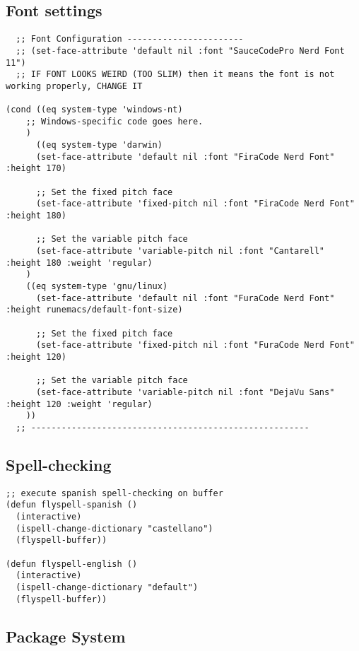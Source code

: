 \documentclass[11pt]{article}
\begin{document}
\subsection{Font settings}
\label{sec:org782d61d}
\begin{verbatim}
  ;; Font Configuration -----------------------
  ;; (set-face-attribute 'default nil :font "SauceCodePro Nerd Font 11")
  ;; IF FONT LOOKS WEIRD (TOO SLIM) then it means the font is not working properly, CHANGE IT

(cond ((eq system-type 'windows-nt)
    ;; Windows-specific code goes here.
    )
      ((eq system-type 'darwin)
      (set-face-attribute 'default nil :font "FiraCode Nerd Font" :height 170)

      ;; Set the fixed pitch face
      (set-face-attribute 'fixed-pitch nil :font "FiraCode Nerd Font" :height 180)

      ;; Set the variable pitch face
      (set-face-attribute 'variable-pitch nil :font "Cantarell" :height 180 :weight 'regular)
    )
    ((eq system-type 'gnu/linux)
      (set-face-attribute 'default nil :font "FuraCode Nerd Font" :height runemacs/default-font-size)

      ;; Set the fixed pitch face
      (set-face-attribute 'fixed-pitch nil :font "FuraCode Nerd Font" :height 120)

      ;; Set the variable pitch face
      (set-face-attribute 'variable-pitch nil :font "DejaVu Sans" :height 120 :weight 'regular)
    ))
  ;; -------------------------------------------------------
\end{verbatim}

\subsection{Spell-checking}
\label{sec:org6c3a70c}
\begin{verbatim}
;; execute spanish spell-checking on buffer
(defun flyspell-spanish ()
  (interactive)
  (ispell-change-dictionary "castellano")
  (flyspell-buffer))

(defun flyspell-english ()
  (interactive)
  (ispell-change-dictionary "default")
  (flyspell-buffer))
\end{verbatim}

\subsection{Package System}
\label{sec:org030bc8a}
\end{document}
